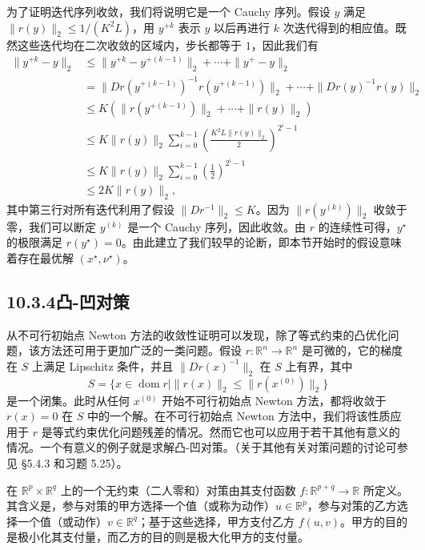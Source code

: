 \documentclass[UTF8,12pt,a4paper,fontset=fandol]{ctexart}
\begin{document}
为了证明迭代序列收敛，我们将说明它是一个 Cauchy 序列。假设 $y$ 满足 $\|r(y)\|_2\leq 1/(K^2L)$，用 $y^{+k}$ 表示 $y$ 以后再进行 $k$ 次迭代得到的相应值。既然这些迭代均在二次收敛的区域内，步长都等于 $1$，因此我们有
\[
\begin{aligned}
\|y^{+k}-y\|_2
&\leq \|y^{+k}-y^{+(k-1)}\|_2+\cdots+\|y^+-y\|_2\\
&=\|Dr(y^{+(k-1)})^{-1}r(y^{+(k-1)})\|_2+\cdots+\|Dr(y)^{-1}r(y)\|_2\\
&\leq K\left(\|r(y^{+(k-1)})\|_2+\cdots+\|r(y)\|_2\right)\\
&\leq K\|r(y)\|_2\sum_{i=0}^{k-1}\left(\frac{K^2L\|r(y)\|_2}{2}\right)^{2^i-1}\\
&\leq K\|r(y)\|_2\sum_{i=0}^{k-1}\left(\frac{1}{2}\right)^{2^i-1}\\
&\leq 2K\|r(y)\|_2,
\end{aligned}
\]
其中第三行对所有迭代利用了假设 $\|Dr^{-1}\|_2\leq K$。因为 $\|r(y^{(k)})\|_2$ 收敛于零，我们可以断定 $y^{(k)}$ 是一个 Cauchy 序列，因此收敛。由 $r$ 的连续性可得，$y^\star$ 的极限满足 $r(y^\star)=0$。由此建立了我们较早的论断，即本节开始时的假设意味着存在最优解 $(x^\star,\nu^\star)$。

\subsection*{10.3.4\quad 凸-凹对策}

从不可行初始点 Newton 方法的收敛性证明可以发现，除了等式约束的凸优化问题，该方法还可用于更加广泛的一类问题。假设 $r:\mathbb{R}^n\to\mathbb{R}^n$ 是可微的，它的梯度在 $S$ 上满足 Lipschitz 条件，并且 $\|Dr(x)^{-1}\|_2$ 在 $S$ 上有界，其中
\[
S=\{x\in\operatorname{dom} r\mid \|r(x)\|_2\leq \|r(x^{(0)})\|_2\}
\]
是一个闭集。此时从任何 $x^{(0)}$ 开始不可行初始点 Newton 方法，都将收敛于 $r(x)=0$ 在 $S$ 中的一个解。在不可行初始点 Newton 方法中，我们将该性质应用于 $r$ 是等式约束优化问题残差的情况。然而它也可以应用于若干其他有意义的情况。一个有意义的例子就是求解凸-凹对策。（关于其他有关对策问题的讨论可参见 \S5.4.3 和习题 5.25）。

在 $\mathbb{R}^p\times\mathbb{R}^q$ 上的一个无约束（二人零和）对策由其支付函数 $f:\mathbb{R}^{p+q}\to\mathbb{R}$ 所定义。其含义是，参与对策的甲方选择一个值（或称为动作）$u\in\mathbb{R}^p$，参与对策的乙方选择一个值（或动作）$v\in\mathbb{R}^q$；基于这些选择，甲方支付乙方 $f(u,v)$。甲方的目的是极小化其支付量，而乙方的目的则是极大化甲方的支付量。
\end{document}

